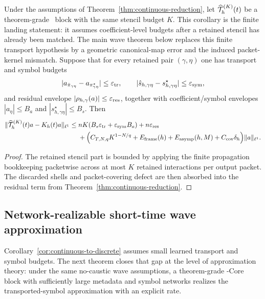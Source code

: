 \begin{corollary}
\label{cor:continuous-to-discrete}
Under the assumptions of Theorem~\ref{thm:continuous-reduction}, let ${\widehat{\mathcal T}_h}^{(K)}(t)$ be a theorem-grade \MiNO\ block with the same stencil budget $K$. This corollary is the finite landing statement: it assumes coefficient-level budgets after a retained stencil has already been matched. The main wave theorem below replaces this finite transport hypothesis by a geometric canonical-map error and the induced packet-kernel mismatch. Suppose that for every retained pair $(\gamma,\eta)$ one has transport and symbol budgets
\[
|a_{\hat\pi_{\gamma\eta}}-a_{\pi^\star_{\gamma\eta}}|\le \varepsilon_{\mathrm{tr}},
\qquad
|\hat s_{h,\gamma\eta}-s_{h,\gamma\eta}^\star|\le \varepsilon_{\mathrm{sym}},
\]
and residual envelope $|\rho_{h,\gamma}(a)|\le \varepsilon_{\mathrm{res}}$, together with coefficient/symbol envelopes $|a_\eta|\le B_a$ and $|s_{h,\gamma\eta}^\star|\le B_s$. Then
\begin{align*}
\|{\widehat{\mathcal T}_h}^{(K)}(t)a-K_h(t)a\|_{\ell^1}
\le{}&
nK(B_s\varepsilon_{\mathrm{tr}}+\varepsilon_{\mathrm{sym}}B_a)
+n\varepsilon_{\mathrm{res}}\\
&+
\Bigl(C_{T,N,q}K^{1-N/q}
+E_{\mathrm{frame}}(h)+E_{\mathrm{asymp}}(h,M)+C_{\mathrm{cov}}\delta_h\Bigr)\|a\|_{\ell^1}.
\end{align*}
\end{corollary}

\begin{proof}
The retained stencil part is bounded by applying the finite propagation bookkeeping packetwise across at most $K$ retained interactions per output packet. The discarded shells and packet-covering defect are then absorbed into the residual term from Theorem~\ref{thm:continuous-reduction}.
\end{proof}

\subsection{Network-realizable short-time wave approximation}
\label{sec:network-realizable-wave}

Corollary~\ref{cor:continuous-to-discrete} assumes small learned transport and symbol budgets.  The next theorem closes that gap at the level of approximation theory: under the same no-caustic wave assumptions, a theorem-grade \MiNO-Core block with sufficiently large metadata and symbol networks realizes the transported-symbol approximation with an explicit rate.

